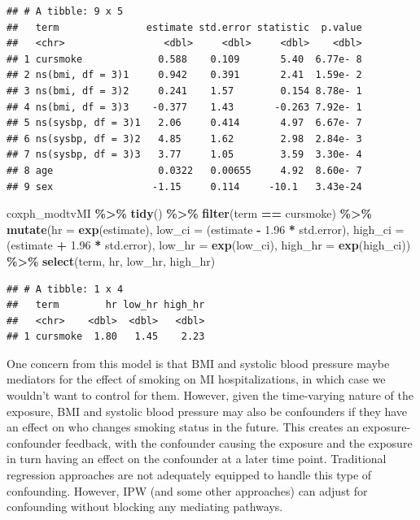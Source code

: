 \documentclass[
]{book}
\newenvironment{Shaded}{\begin{snugshade}}{\end{snugshade}}
\newcommand{\AttributeTok}[1]{\textcolor[rgb]{0.13,0.29,0.53}{#1}}
\newcommand{\FloatTok}[1]{\textcolor[rgb]{0.00,0.00,0.81}{#1}}
\newcommand{\FunctionTok}[1]{\textcolor[rgb]{0.13,0.29,0.53}{\textbf{#1}}}
\newcommand{\NormalTok}[1]{#1}
\newcommand{\SpecialCharTok}[1]{\textcolor[rgb]{0.81,0.36,0.00}{\textbf{#1}}}
\newcommand{\StringTok}[1]{\textcolor[rgb]{0.31,0.60,0.02}{#1}}
\begin{document}
\begin{verbatim}
## # A tibble: 9 x 5
##   term               estimate std.error statistic  p.value
##   <chr>                 <dbl>     <dbl>     <dbl>    <dbl>
## 1 cursmoke             0.588    0.109       5.40  6.77e- 8
## 2 ns(bmi, df = 3)1     0.942    0.391       2.41  1.59e- 2
## 3 ns(bmi, df = 3)2     0.241    1.57        0.154 8.78e- 1
## 4 ns(bmi, df = 3)3    -0.377    1.43       -0.263 7.92e- 1
## 5 ns(sysbp, df = 3)1   2.06     0.414       4.97  6.67e- 7
## 6 ns(sysbp, df = 3)2   4.85     1.62        2.98  2.84e- 3
## 7 ns(sysbp, df = 3)3   3.77     1.05        3.59  3.30e- 4
## 8 age                  0.0322   0.00655     4.92  8.60e- 7
## 9 sex                 -1.15     0.114     -10.1   3.43e-24
\end{verbatim}

\begin{Shaded}
\begin{Highlighting}[]
\NormalTok{coxph\_modtvMI }\SpecialCharTok{\%\textgreater{}\%} 
  \FunctionTok{tidy}\NormalTok{() }\SpecialCharTok{\%\textgreater{}\%} 
  \FunctionTok{filter}\NormalTok{(term }\SpecialCharTok{==} \StringTok{\textquotesingle{}cursmoke\textquotesingle{}}\NormalTok{) }\SpecialCharTok{\%\textgreater{}\%}
  \FunctionTok{mutate}\NormalTok{(}\AttributeTok{hr =} \FunctionTok{exp}\NormalTok{(estimate),}
         \AttributeTok{low\_ci =}\NormalTok{ (estimate }\SpecialCharTok{{-}} \FloatTok{1.96} \SpecialCharTok{*}\NormalTok{ std.error), }
         \AttributeTok{high\_ci =}\NormalTok{ (estimate }\SpecialCharTok{+} \FloatTok{1.96} \SpecialCharTok{*}\NormalTok{ std.error), }
         \AttributeTok{low\_hr =} \FunctionTok{exp}\NormalTok{(low\_ci), }
         \AttributeTok{high\_hr =} \FunctionTok{exp}\NormalTok{(high\_ci)) }\SpecialCharTok{\%\textgreater{}\%} 
  \FunctionTok{select}\NormalTok{(term, hr, low\_hr, high\_hr)}
\end{Highlighting}
\end{Shaded}

\begin{verbatim}
## # A tibble: 1 x 4
##   term        hr low_hr high_hr
##   <chr>    <dbl>  <dbl>   <dbl>
## 1 cursmoke  1.80   1.45    2.23
\end{verbatim}

One concern from this model is that BMI and systolic blood pressure maybe mediators for the effect of smoking on MI hospitalizations, in which case we wouldn't want to control for them. However, given the time-varying nature of the exposure, BMI and systolic blood pressure may also be confounders if they have an effect on who changes smoking status in the future. This creates an exposure-confounder feedback, with the confounder causing the exposure and the exposure in turn having an effect on the confounder at a later time point. Traditional regression approaches are not adequately equipped to handle this type of confounding. However, IPW (and some other approaches) can adjust for confounding without blocking any mediating pathways.
\end{document}
